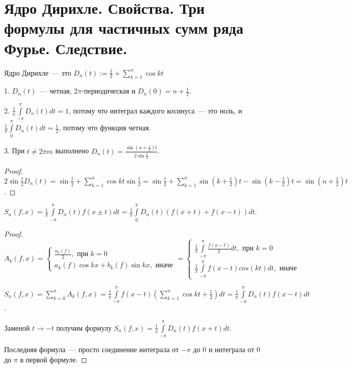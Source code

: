 \section{Ядро Дирихле. Свойства. Три формулы
для частичных сумм ряда Фурье. Следствие.}

\begin{definition}
    Ядро Дирихле~--- это $D_n(t) := \frac{1}{2} + \sum \limits_{k = 1}^{n} \cos kt$
\end{definition}

\begin{properties}
    1. $D_n(t)$~--- четная, $2 \pi$-периодическая и $D_n(0) = n + \frac{1}{2}$.

    2. $\frac{1}{\pi} \int \limits_{-\pi}^{\pi} D_n(t) dt = 1$, потому что интеграл каждого косинуса~--- это ноль, и  $\frac{1}{\pi} \int \limits_{0}^{\pi} D_n(t) dt = \frac{1}{2}$,
    потому что функция четная.

    3. При $t \neq 2 \pi m$ выполнено $D_n(t) = \frac{\sin(n + \frac{1}{2}) t}{2 \sin \frac{t}{2}}$.
\end{properties}

\begin{proof}
    $2 \sin \frac{t}{2} D_n(t) = \sin \frac{t}{2} + \sum \limits_{k = 1}^{n} \cos kt \sin \frac{t}{2} =
        \sin \frac{t}{2} + \sum \limits_{k = 1}^{n} \sin(k + \frac{1}{2}) t - \sin (k - \frac{1}{2}) t = \sin(n + \frac{1}{2}) t$.
\end{proof}

\begin{lemma}
    $S_n(f, x) = \frac{1}{\pi} \int \limits_{-\pi}^{\pi} D_n(t) f(x \pm t) dt =
        \frac{1}{\pi} \int \limits_{0}^{\pi} D_n(t) (f(x + t) + f(x - t)) dt$.
\end{lemma}

\begin{proof}
    $A_k(f, x) = \begin{cases}
            \frac{a_0(f)}{2}, \text{ при } k = 0 \\
            a_k(f) \cos kx + b_k(f) \sin kx, \text{ иначе}
        \end{cases} =
        \begin{cases}
            \frac{1}{\pi} \int \limits_{-\pi}^{\pi} \frac{f(x - t)}{2} dt, \text{ при } k = 0 \\
            \frac{1}{\pi} \int \limits_{-\pi}^{\pi} f(x - t) cos(kt) dt , \text{ иначе}
        \end{cases}$

    $S_n(f, x) = \sum \limits_{k = 0}^{n} A_k(f, x) = \frac{1}{\pi} \int \limits_{-\pi}^{\pi} f(x - t) \left(
        \sum \limits_{k = 1}^{n} \cos kt + \frac{1}{2} \right) dt = \frac{1}{\pi} \int \limits_{-\pi}^{\pi} D_n(t) f(x - t) dt$.

    Заменой $t \to -t$ получим формулу $S_n(f, x) = \frac{1}{\pi} \int \limits_{-\pi}^{\pi} D_n(t) f(x + t) dt$.

    Последняя формула~--- просто соединение интеграла от $-\pi$ до $0$ и интеграла от $0$ до $\pi$ в первой формуле.
\end{proof}

